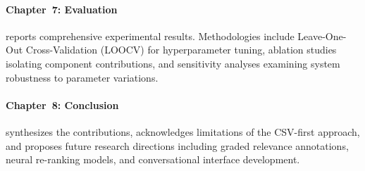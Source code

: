 \paragraph{Chapter~7: Evaluation} reports comprehensive experimental results. Methodologies include Leave-One-Out Cross-Validation (LOOCV) for hyperparameter tuning, ablation studies isolating component contributions, and sensitivity analyses examining system robustness to parameter variations.

\paragraph{Chapter~8: Conclusion} synthesizes the contributions, acknowledges limitations of the CSV-first approach, and proposes future research directions including graded relevance annotations, neural re-ranking models, and conversational interface development.
